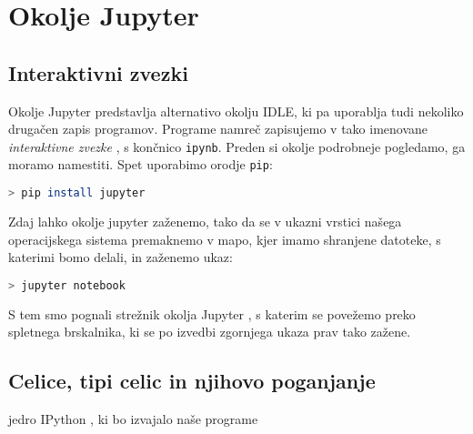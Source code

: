 \chapter{Okolje Jupyter}

\section{Interaktivni zvezki}
Okolje Jupyter predstavlja alternativo okolju IDLE, ki pa uporablja tudi nekoliko drugačen zapis programov. Programe namreč zapisujemo v tako imenovane \emph{interaktivne zvezke} , s končnico \texttt{ipynb}. Preden si okolje podrobneje pogledamo, ga moramo namestiti. Spet uporabimo orodje \texttt{pip}:
\begin{lstlisting}[language=bash]
> pip install jupyter
\end{lstlisting}
Zdaj lahko okolje jupyter zaženemo, tako da se v ukazni vrstici našega operacijskega sistema premaknemo v mapo, kjer imamo shranjene datoteke, s katerimi bomo delali, in zaženemo ukaz:
\begin{lstlisting}[language=bash]
> jupyter notebook
\end{lstlisting}
S tem smo pognali strežnik okolja Jupyter , s katerim se povežemo preko spletnega brskalnika, ki se po izvedbi zgornjega ukaza prav tako zažene. 

\section{Celice, tipi celic in njihovo poganjanje}



jedro IPython , ki bo izvajalo naše programe
